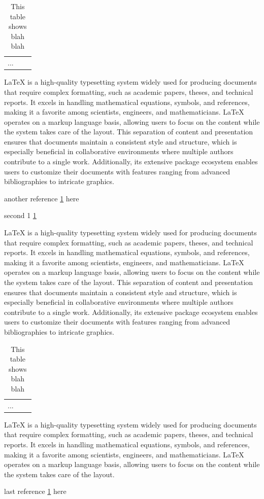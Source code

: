 \documentclass[11pt]{article}
\begin{document}
\begin{table}[h]
\begin{center}
\begin{tabular}{|c||l|p{1in}|}
...
\end{tabular}
\end{center}
\caption{ \label{mytable}
This table shows blah blah}
\end{table}

LaTeX is a high-quality typesetting system widely used for producing documents that require complex formatting, such as academic papers, theses, and technical reports. It excels in handling mathematical equations, symbols, and references, making it a favorite among scientists, engineers, and mathematicians. LaTeX operates on a markup language basis, allowing users to focus on the content while the system takes care of the layout. This separation of content and presentation ensures that documents maintain a consistent style and structure, which is especially beneficial in collaborative environments where multiple authors contribute to a single work. Additionally, its extensive package ecosystem enables users to customize their documents with features ranging from advanced bibliographies to intricate graphics.

another reference \ref{mytable} here

second 1 \ref{mytable}

LaTeX is a high-quality typesetting system widely used for producing documents that require complex formatting, such as academic papers, theses, and technical reports. It excels in handling mathematical equations, symbols, and references, making it a favorite among scientists, engineers, and mathematicians. LaTeX operates on a markup language basis, allowing users to focus on the content while the system takes care of the layout. This separation of content and presentation ensures that documents maintain a consistent style and structure, which is especially beneficial in collaborative environments where multiple authors contribute to a single work. Additionally, its extensive package ecosystem enables users to customize their documents with features ranging from advanced bibliographies to intricate graphics. 

\begin{table}[b]
\begin{center}
\begin{tabular}{|c||l|p{1in}|}
...
\end{tabular}
\end{center}
\caption{ \label{mytable2}
This table shows blah blah}
\end{table}

LaTeX is a high-quality typesetting system widely used for producing documents that require complex formatting, such as academic papers, theses, and technical reports. It excels in handling mathematical equations, symbols, and references, making it a favorite among scientists, engineers, and mathematicians. LaTeX operates on a markup language basis, allowing users to focus on the content while the system takes care of the layout. 

last reference \ref{mytable} here

\newpage

\listoftables
\end{document}

